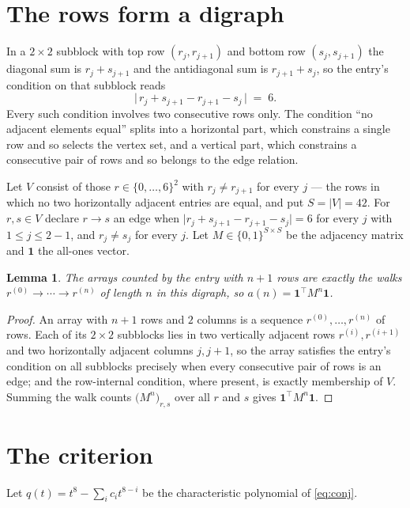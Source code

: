 \documentclass[11pt,a4paper]{article}
\theoremstyle{plain}
\newtheorem{lemma}[theorem]{Lemma}
\theoremstyle{definition}
\begin{document}
\section{The rows form a digraph}

In a $2\times2$ subblock with top row $(r_j,r_{j+1})$ and bottom row $(s_j,s_{j+1})$ the
diagonal sum is $r_j+s_{j+1}$ and the antidiagonal sum is $r_{j+1}+s_j$, so the entry's
condition on that subblock reads
\[
\bigl|\,r_j+s_{j+1}-r_{j+1}-s_j\,\bigr|\;=\;6.
\]
Every such condition involves two consecutive rows only. The condition ``no adjacent elements equal'' splits into a horizontal
part, which constrains a single row and so selects the vertex set, and a vertical part,
which constrains a consecutive pair of rows and so belongs to the edge relation.

Let $V$ consist of those $r\in\{0,\dots,6\}^{2}$ with $r_j\ne r_{j+1}$ for every
$j$ --- the rows in which no two horizontally adjacent entries are equal, and put $S=|V|=42$. For $r,s\in V$ declare $r\to s$ an edge
when $\bigl|r_j+s_{j+1}-r_{j+1}-s_j\bigr|=6$ for every $j$ with
$1\le j\le2-1$, and $r_j\ne s_j$ for every $j$. Let $M\in\{0,1\}^{S\times S}$ be the adjacency matrix and $\mathbf{1}$
the all-ones vector.

\begin{lemma}\label{lem:walk}
The arrays counted by the entry with $n+1$ rows are exactly the walks
$r^{(0)}\to\cdots\to r^{(n)}$ of length $n$ in this digraph, so
$a(n)=\mathbf{1}^{\!\top}M^{n}\mathbf{1}$.
\end{lemma}

\begin{proof}
An array with $n+1$ rows and $2$ columns is a sequence $r^{(0)},\dots,r^{(n)}$ of
rows. Each of its $2\times2$ subblocks lies in two vertically adjacent rows
$r^{(i)},r^{(i+1)}$ and two horizontally adjacent columns $j,j+1$, so the array satisfies
the entry's condition on all subblocks precisely when every consecutive pair of rows is an
edge; and the row-internal condition, where present, is exactly membership of $V$. Summing
the walk counts $\bigl(M^{n}\bigr)_{r,s}$ over all $r$ and $s$ gives
$\mathbf{1}^{\!\top}M^{n}\mathbf{1}$.
\end{proof}

\section{The criterion}

Let $q(t)=t^{8}-\sum_i c_i t^{8-i}$ be the characteristic polynomial of
\eqref{eq:conj}.
\end{document}
